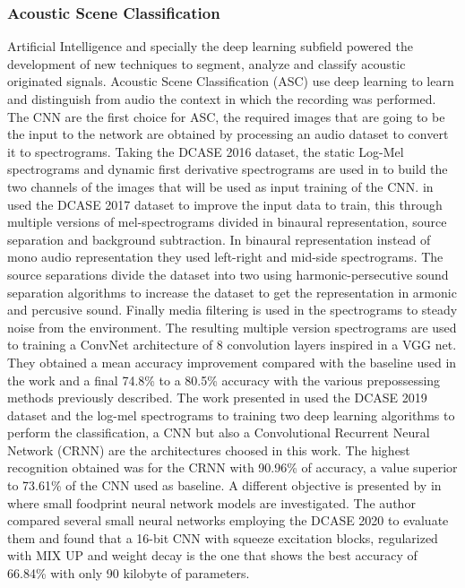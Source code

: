 \subsubsection{Acoustic Scene Classification}

Artificial Intelligence and specially the deep learning subfield powered the development of new techniques to segment, analyze and classify acoustic originated signals. Acoustic Scene Classification (ASC) use deep learning to learn and distinguish from audio the context in which the recording was performed. The CNN are the first choice for ASC, the required images that are going to be the input to the network are obtained by processing an audio dataset to convert it to spectrograms. Taking the DCASE 2016 dataset, the static Log-Mel spectrograms and dynamic first derivative spectrograms are used in \cite{CNNASC1} to build the two channels of the images that will be used as input training of the CNN. \citeauthor{CNNASC2} in \cite{CNNASC2} used the DCASE 2017 dataset to improve the input data to train, this through multiple versions of mel-spectrograms divided in binaural representation, source separation and background subtraction. In binaural representation instead of mono audio representation they used left-right and mid-side spectrograms. The source separations divide the dataset into two using harmonic-persecutive sound separation algorithms to increase the dataset to get the representation in armonic and percusive sound. Finally media filtering is used in the spectrograms to steady noise from the environment. The resulting multiple version spectrograms are used to training a ConvNet architecture of 8 convolution layers inspired in a VGG net. They obtained a mean accuracy improvement compared with the baseline used in the work and a final 74.8\% to a 80.5\% accuracy with the various prepossessing methods previously described. The work presented in \cite{ASC3} used the DCASE 2019 dataset and the log-mel spectrograms to training two deep learning algorithms to perform the classification, a CNN but also a Convolutional Recurrent Neural Network (CRNN) are the architectures choosed in this work. The highest recognition obtained was for the CRNN with 90.96\% of accuracy, a value superior to 73.61\% of the CNN used as baseline. A different objective is presented by \citeauthor{ASC4} in \cite{ASC4} where small foodprint neural network models are investigated. The author compared several small neural networks employing the DCASE 2020 to evaluate them and found that a 16-bit CNN with squeeze excitation blocks, regularized with MIX UP and weight decay is the one that shows the best accuracy of 66.84\% with only 90 kilobyte of parameters.         

